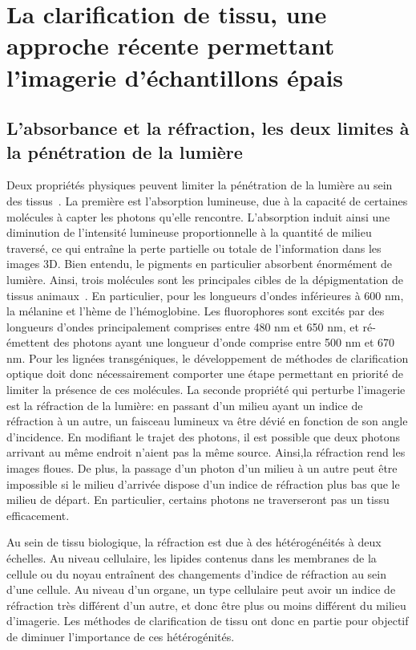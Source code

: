 \documentclass[\main/main.tex]{subfiles}
\begin{document}
\section{La clarification de tissu, une approche récente permettant l'imagerie d'échantillons épais}

\subsection{L'absorbance et la réfraction, les deux limites à la pénétration de la lumière}

%
Deux propriétés physiques peuvent limiter la pénétration de la lumière au sein des tissus~\cite{sandell_2011}. La première est l'absorption lumineuse, due à la capacité de certaines molécules à capter les photons qu'elle rencontre.
%
L'absorption induit ainsi une diminution de l'intensité lumineuse proportionnelle à la quantité de milieu traversé, ce qui entraîne la perte partielle ou totale de l'information dans les images 3D.
%
Bien entendu, le pigments en particulier absorbent énormément de lumière. Ainsi, trois molécules sont les principales cibles de la dépigmentation de tissus animaux~\cite{sandell_2011,antinucci_2016,pende_2020}. En particulier, pour les longueurs d'ondes inférieures à 600 nm, la mélanine et l'hème de l'hémoglobine. Les fluorophores sont excités par des longueurs d'ondes principalement comprises entre 480 nm et 650 nm, et ré-émettent des photons ayant une longueur d'onde comprise entre 500 nm et 670 nm.
Pour les lignées transgéniques, le développement de méthodes de clarification optique doit donc nécessairement comporter une étape permettant en priorité de limiter la présence de ces molécules.
%
La seconde propriété qui perturbe l'imagerie est la réfraction de la lumière: en passant d'un milieu ayant un indice de réfraction à un autre, un faisceau lumineux va être dévié en fonction de son angle d'incidence. En modifiant le trajet des photons, il est possible que deux photons arrivant au même endroit n'aient pas la même source. Ainsi,la réfraction rend les images floues.
%
De plus, la passage d'un photon d'un milieu à un autre peut être impossible si le milieu d'arrivée dispose d'un indice de réfraction plus bas que le milieu de départ. En particulier, certains photons ne traverseront pas un tissu efficacement.

%
Au sein de tissu biologique, la réfraction est due à des hétérogénéités à deux échelles. Au niveau cellulaire, les lipides contenus dans les membranes de la cellule ou du noyau entraînent des changements d'indice de réfraction au sein d'une cellule. Au niveau d'un organe, un type cellulaire peut avoir un indice de réfraction très différent d'un autre, et donc être plus ou moins différent du milieu d'imagerie.
%
Les méthodes de clarification de tissu ont donc en partie pour objectif de diminuer l'importance de ces hétérogénités.
\end{document}
